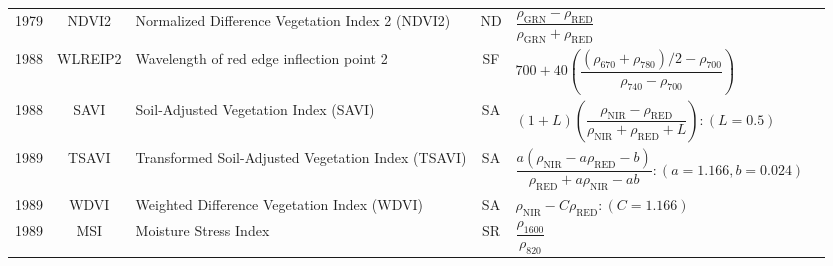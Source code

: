 \documentclass[10pt]{article}
\begin{document}
\begin{ThreePartTable}
\begin{longtable}{c c m{2.3in} c M{2.8in} M{1.5in}}
  1979 & NDVI2   & Normalized Difference Vegetation Index 2 (NDVI2)                               & ND & $\dfrac{\rho_\text{GRN}-\rho_\text{RED}}{\rho_\text{GRN}+\rho_\text{RED}}$                                                                                                                                                                                                              & \citet{Tucker1979}                                  \\
  1988 & WLREIP2 & Wavelength of red edge inflection point 2                                      & SF & $700+40\left(\dfrac{(\rho_{670}+\rho_{780})/2-\rho_{700}}{\rho_{740}-\rho_{700}}\right)$                                                                                                                                                                                                & \citet{Guyot1988,Cho2006}                           \\
  1988 & SAVI    & Soil-Adjusted Vegetation Index (SAVI)                                          & SA & $(1 + L)\left(\dfrac{\rho_\text{NIR}-\rho_\text{RED}}{\rho_\text{NIR}+\rho_\text{RED}+L}\right):(L=0.5)$                                                                                                                                                                                & \citet{Huete1988}                                   \\
  1989 & TSAVI   & Transformed Soil-Adjusted Vegetation Index (TSAVI)                             & SA & $\dfrac{a(\rho_\text{NIR}-a\rho_\text{RED}-b)}{\rho_\text{RED}+a\rho_\text{NIR}-ab}:(a=1.166,b=0.024)$                                                                                                                                                                                  & \citet{Baret1989,Huete1984}                         \\
  1989 & WDVI    & Weighted Difference Vegetation Index (WDVI)                                    & SA & $\rho_\text{NIR}-C\rho_\text{RED}:(C=1.166)$                                                                                                                                                                                                                                            & \citet{Clevers1989,Huete1984}                       \\
  1989 & MSI     & Moisture Stress Index                                                          & SR & $\dfrac{\rho_{1600}}{\rho_{820}}$                                                                                                                                                                                                                                                       & \citet{Hunt1989}                                    \\

\end{longtable}
\end{ThreePartTable}
\end{document}
